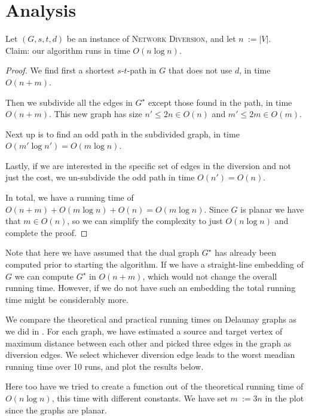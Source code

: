 \section{Analysis}

\begin{theorem}
    Let $(G, s, t, d)$ be an instance of \textsc{Network Diversion}, and let $n~:= |V|$. \\
    Claim: our algorithm runs in time $O(n \log n)$.
    
    \begin{proof}
        We find first a shortest $s$-$t$-path in $G$ that does not use $d$, in time $O(n+m)$.
    
        Then we subdivide all the edges in $G^\star$ except those found in the path, in time $O(n+m)$. This new graph has size $n' \leq 2n \in O(n)$ and $m' \leq 2m \in O(m)$.
    
        Next up is to find an odd path in the subdivided graph, in time $O(m' \log n') = O(m \log n)$.
    
        Lastly, if we are interested in the specific set of edges in the diversion and not just the cost, we un-subdivide the odd path in time $O(n') = O(n)$.
    
        In total, we have a running time of $O(n+m) + O(m \log n) + O(n) = O(m \log n)$. Since $G$ is planar we have that $m \in O(n)$, so we can simplify the complexity to just $O(n \log n)$ and complete the proof.
    \end{proof}
\end{theorem}

Note that here we have assumed that the dual graph $G^\star$ has already been computed prior to starting the algorithm. If we have a straight-line embedding of $G$ we can compute $G^\star$ in $O(n+m)$, which would not change the overall running time. However, if we do not have such an embedding the total running time might be considerably more.

We compare the theoretical and practical running times on Delaunay graphs as we did in . For each graph, we have estimated a source and target vertex of maximum distance between each other and picked three edges in the graph as diversion edges. We select whichever diversion edge leads to the worst meadian running time over 10 runs, and plot the results below.

Here too have we tried to create a function out of the theoretical running time of $O(n \log n)$, this time with different constants. We have set $m~:= 3n$ in the plot since the graphs are planar.

